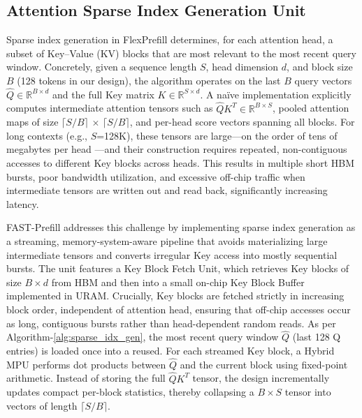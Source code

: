 \documentclass[conference]{IEEEtran}
\begin{document}
\subsection{Attention Sparse Index Generation Unit}
\label{Sec_SIGU}
Sparse index generation in FlexPrefill determines, for each attention head, a subset of Key–Value (KV) blocks that are most relevant to the most recent query window. Concretely, given a sequence length $S$, head dimension $d$, and block size $B$ (128 tokens in our design), the algorithm operates on the last $B$ query vectors $\hat{Q} \in \mathbb{R}^{B \times d}$ and the full Key matrix $K \in \mathbb{R}^{S \times d}$. A naïve implementation explicitly computes intermediate attention tensors such as $\hat{Q}K^T \in \mathbb{R}^{B \times S}$, pooled attention maps of size $\lceil S/B \rceil$ $\times$ $\lceil S/B \rceil $, and per-head score vectors spanning all blocks. For long contexts (e.g., $S$=128K), these tensors are large—on the order of tens of megabytes per head —and their construction requires repeated, non-contiguous accesses to different Key blocks across heads. This results in multiple short HBM bursts, poor bandwidth utilization, and excessive off-chip traffic when intermediate tensors are written out and read back, significantly increasing latency. 

FAST-Prefill addresses this challenge by implementing sparse index generation as a streaming, memory-system-aware pipeline that avoids materializing large intermediate tensors and converts irregular Key access into mostly sequential bursts. The unit features a Key Block Fetch Unit, which retrieves Key blocks of size $B \times d$ from HBM and then into a small on-chip Key Block Buffer implemented in URAM. Crucially, Key blocks are fetched strictly in increasing block order, independent of attention head, ensuring that off-chip accesses occur as long, contiguous bursts rather than head-dependent random reads. 
As per Algorithm-\ref{alg:sparse_idx_gen}, the most recent query window $\hat{Q}$ (last 128 Q entries) is loaded once into a reused. 
For each streamed Key block, a Hybrid MPU performs dot products between $\hat{Q}$ and the current block using fixed-point arithmetic. Instead of storing the full $\hat{Q}K^T$ tensor, the design incrementally updates compact per-block statistics, thereby collapsing a $B \times S$ tensor into vectors of length $\lceil S/B \rceil$.
\end{document}
